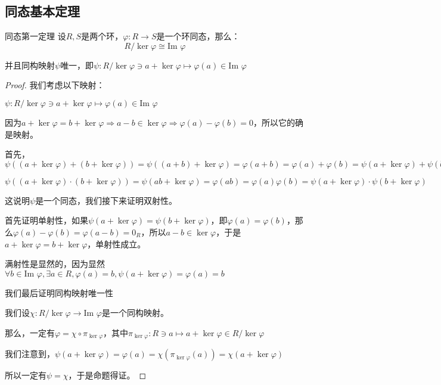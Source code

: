 \documentclass[12pt, a4paper, oneside, UTF8]{ctexbook}
\begin{document}
		\subsection{同态基本定理}
			\begin{them}{同态第一定理}{}
				设$R,S$是两个环，$\varphi : R \rightarrow S$是一个环同态，那么：
				\begin{equation}
					R / \ker \varphi \cong \text{Im }\varphi 
				\end{equation}

				并且同构映射$\psi $唯一，即$\psi : R / \ker \varphi \ni a+\ker \varphi  \mapsto \varphi (a) \in \text{Im }\varphi $
			\end{them}
			\begin{proof}
				我们考虑以下映射：

				$\psi : R / \ker \varphi \ni a+\ker \varphi  \mapsto \varphi (a) \in \text{Im }\varphi $

				因为$a+\ker \varphi =b+\ker \varphi \Rightarrow a-b \in \ker \varphi \Rightarrow \varphi (a)-\varphi (b)=0$，所以它的确是映射。

				首先，$\psi \left((a+\ker \varphi )+(b+\ker \varphi )\right)=\psi \left((a+b)+\ker \varphi \right)=\varphi (a+b)=\varphi (a)+\varphi (b)=\psi (a+\ker \varphi )+\psi (b+\ker \varphi )$
				
				$\psi \left((a+\ker \varphi )\cdot (b+\ker \varphi )\right)=\psi (ab+\ker \varphi )=\varphi (ab)=\varphi (a)\varphi (b)=\psi (a+\ker \varphi )\cdot \psi (b+\ker \varphi )$

				这说明$\psi $是一个同态，我们接下来证明双射性。

				首先证明单射性，如果$\psi (a+\ker \varphi )=\psi (b+\ker \varphi )$，即$\varphi (a)=\varphi (b)$，那么$\varphi (a)-\varphi (b)=\varphi (a-b)=0_R$，所以$a-b \in \ker \varphi $，于是$a+\ker \varphi =b+\ker \varphi $，单射性成立。

				满射性是显然的，因为显然$\forall b \in \text{Im }\varphi ,\exists a \in R,\varphi (a)=b,\psi (a+\ker \varphi )=\varphi (a)=b$

				我们最后证明同构映射唯一性

				我们设$\chi  : R / \ker \varphi \rightarrow \text{Im }\varphi $是一个同构映射。

				那么，一定有$\varphi =\chi \circ \pi_{\ker \varphi }$，其中$\pi_{\ker \varphi } : R \ni a \mapsto  a+\ker \varphi \in R/\ker \varphi $

				我们注意到，$\psi(a+\ker \varphi )=\varphi (a)=\chi \left(\pi_{\ker \varphi }(a)\right)=\chi(a+\ker \varphi )$
				
				所以一定有$\psi =\chi $，于是命题得证。
			\end{proof}
\end{document}
